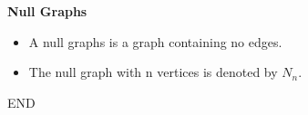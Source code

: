 \documentclass{beamer}
\begin{document}
\begin{frame}
\Large
\vspace{-2cm}
\textbf{Null Graphs}
\begin{itemize}
\item A null graphs is a graph containing no edges. \item The null graph with n vertices is denoted by $N_n$.
\end{itemize}

\end{frame}


\begin{frame}
END
\end{frame}
\end{document}
